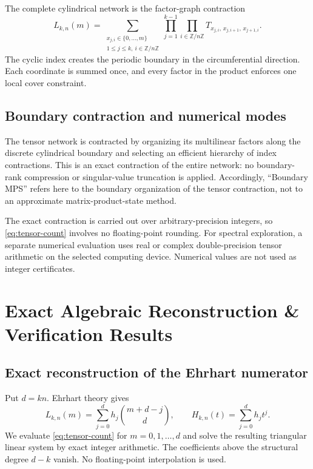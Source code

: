 \documentclass[11pt,a4paper]{article}
\theoremstyle{definition}
\begin{document}
The complete cylindrical network is the factor-graph contraction
\begin{equation}\label{eq:tensor-count}
L_{k,n}(m)=
\sum_{\substack{x_{j,i}\in\{0,\ldots,m\}\\
1\le j\le k,\ i\in\mathbb{Z}/n\mathbb{Z}}}
\prod_{j=1}^{k-1}\prod_{i\in\mathbb{Z}/n\mathbb{Z}}
T_{x_{j,i},\,x_{j,i+1},\,x_{j+1,i}}.
\end{equation}
The cyclic index creates the periodic boundary in the circumferential direction. Each coordinate is summed once, and every factor in the product enforces one local cover constraint.

\subsection{Boundary contraction and numerical modes}

The tensor network is contracted by organizing its multilinear factors
along the discrete cylindrical boundary and selecting an efficient
hierarchy of index contractions. This is an exact contraction of the
entire network: no boundary-rank compression or singular-value
truncation is applied. Accordingly, ``Boundary MPS'' refers here to the
boundary organization of the tensor contraction, not to an approximate
matrix-product-state method.

The exact contraction is carried out over arbitrary-precision integers,
so \eqref{eq:tensor-count} involves no floating-point rounding. For
spectral exploration, a separate numerical evaluation uses real or
complex double-precision tensor arithmetic on the selected computing
device. Numerical values are not used as integer certificates.

\section{Exact Algebraic Reconstruction \& Verification Results}

\subsection{Exact reconstruction of the Ehrhart numerator}

Put $d=kn$. Ehrhart theory gives
\begin{equation}\label{eq:binomial-basis}
L_{k,n}(m)=\sum_{j=0}^{d}h_j\binom{m+d-j}{d},
\qquad H_{k,n}(t)=\sum_{j=0}^{d}h_jt^j.
\end{equation}
We evaluate \eqref{eq:tensor-count} for $m=0,1,\ldots,d$ and solve the
resulting triangular linear system by exact integer arithmetic. The
coefficients above the structural degree $d-k$ vanish. No
floating-point interpolation is used.
\end{document}

